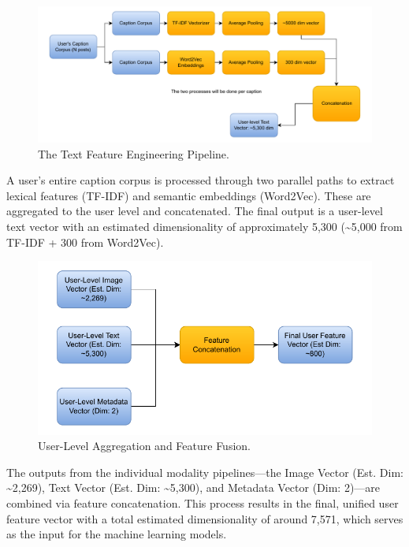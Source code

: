 \begin{figure}[H]
	\centering
	\includegraphics[width=\textwidth]{"figures/Text-Pipeline-Diagram.pdf"}
	\caption{The Text Feature Engineering Pipeline. }
	\label{fig:text_pipeline_diagram}
\end{figure}

A user's entire caption corpus is processed through two parallel paths to extract lexical features (TF-IDF) and semantic embeddings (Word2Vec). These are aggregated to the user level and concatenated. The final output is a user-level text vector with an estimated dimensionality of approximately 5,300 (\textasciitilde5,000 from TF-IDF + 300 from Word2Vec).


\begin{figure}[H]
	\centering
	\includegraphics[width=\textwidth]{"figures/Fusion-Diagram.pdf"}
	\caption{User-Level Aggregation and Feature Fusion.}
	\label{fig:fusion_diagram}
\end{figure}

The outputs from the individual modality pipelines—the Image Vector (Est. Dim: \textasciitilde2,269), Text Vector (Est. Dim: \textasciitilde5,300), and Metadata Vector (Dim: 2)—are combined via feature concatenation. This process results in the final, unified user feature vector with a total estimated dimensionality of around 7,571, which serves as the input for the machine learning models.

